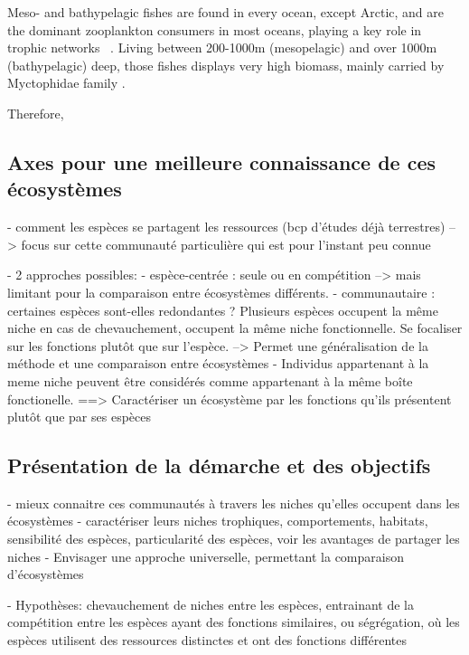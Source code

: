 Meso- and bathypelagic fishes are found in every ocean, except Arctic, and are the dominant zooplankton consumers in most oceans, playing a key role in trophic networks \citep{davison2015}~. Living between 200-1000m (mesopelagic) and over 1000m (bathypelagic) deep, those fishes displays very high biomass, mainly carried by Myctophidae family \citep{gaskett2001,kozlov1995,pusch2004}. 

Therefore, 







\subsection{Axes pour une meilleure connaissance de ces écosystèmes}
- comment les espèces se partagent les ressources (bcp d'études déjà terrestres)
         --> focus sur cette communauté particulière qui est pour l'instant peu connue

- 2 approches possibles: 
		- espèce-centrée : seule ou en compétition --> mais limitant pour la comparaison entre écosystèmes différents. 
		- communautaire : certaines espèces sont-elles redondantes ? Plusieurs espèces
occupent la même niche en cas de chevauchement, occupent la même niche fonctionnelle. Se focaliser
sur les fonctions plutôt que sur l'espèce. --> Permet une généralisation de la méthode et une comparaison entre écosystèmes
		- Individus appartenant à la meme niche peuvent être considérés comme appartenant
à la même boîte fonctionelle. 
==> Caractériser un écosystème par les fonctions qu'ils présentent plutôt que par ses espèces

\subsection{Présentation de la démarche et des objectifs}
- mieux connaitre ces communautés à travers les niches qu'elles occupent dans les écosystèmes
- caractériser leurs niches trophiques, comportements, habitats, sensibilité des espèces, 
particularité des espèces, voir les avantages de partager les niches 
- Envisager une approche universelle, permettant la comparaison d'écosystèmes

- Hypothèses: chevauchement de niches entre les espèces, entrainant de la compétition entre les espèces ayant des fonctions similaires, ou ségrégation, où les espèces
utilisent des ressources distinctes et ont des fonctions différentes

